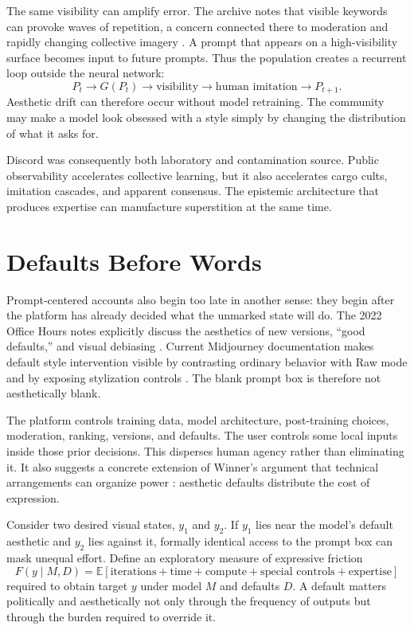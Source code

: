 \documentclass[11pt]{article}
\begin{document}
The same visibility can amplify error. The archive notes that visible keywords can provoke waves of repetition, a concern connected there to moderation and rapidly changing collective imagery \parencite{hartsoe2022midjourneyarchive}. A prompt that appears on a high-visibility surface becomes input to future prompts. Thus the population creates a recurrent loop outside the neural network:
\[
P_t \rightarrow G(P_t) \rightarrow \text{visibility} \rightarrow \text{human imitation} \rightarrow P_{t+1}.
\]
Aesthetic drift can therefore occur without model retraining. The community may make a model look obsessed with a style simply by changing the distribution of what it asks for.

Discord was consequently both laboratory and contamination source. Public observability accelerates collective learning, but it also accelerates cargo cults, imitation cascades, and apparent consensus. The epistemic architecture that produces expertise can manufacture superstition at the same time.

\section{Defaults Before Words}

Prompt-centered accounts also begin too late in another sense: they begin after the platform has already decided what the unmarked state will do. The 2022 Office Hours notes explicitly discuss the aesthetics of new versions, ``good defaults,'' and visual debiasing \parencite{hartsoe2022midjourneyarchive}. Current Midjourney documentation makes default style intervention visible by contrasting ordinary behavior with Raw mode and by exposing stylization controls \parencite{midjourneyRaw,midjourneyStylize}. The blank prompt box is therefore not aesthetically blank.

The platform controls training data, model architecture, post-training choices, moderation, ranking, versions, and defaults. The user controls some local inputs inside those prior decisions. This disperses human agency rather than eliminating it. It also suggests a concrete extension of Winner's argument that technical arrangements can organize power \parencite{winner1980artifacts}: aesthetic defaults distribute the cost of expression.

Consider two desired visual states, $y_1$ and $y_2$. If $y_1$ lies near the model's default aesthetic and $y_2$ lies against it, formally identical access to the prompt box can mask unequal effort. Define an exploratory measure of expressive friction
\[
F(y\mid M,D)=\mathbb{E}[\text{iterations} + \text{time} + \text{compute} + \text{special controls} + \text{expertise}]
\]
required to obtain target $y$ under model $M$ and defaults $D$. A default matters politically and aesthetically not only through the frequency of outputs but through the burden required to override it.
\end{document}
